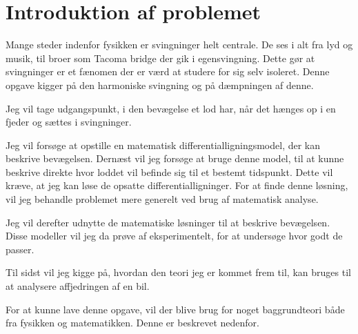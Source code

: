 \chapter{Introduktion af problemet}
Mange steder indenfor fysikken er svingninger helt centrale. 
De ses i alt fra lyd og musik, til broer som Tacoma bridge der gik i egensvingning. 
Dette gør at svingninger er et fænomen der er værd at studere for sig selv isoleret. 
Denne opgave kigger på den harmoniske svingning og på dæmpningen af denne.

Jeg vil tage udgangspunkt, i den bevægelse et lod har, når det hænges op i en fjeder og sættes i svingninger.

Jeg vil forsøge at opstille en matematisk differentialligningsmodel, der kan beskrive bevægelsen.
Dernæst vil jeg forsøge at bruge denne model, til at kunne beskrive direkte hvor loddet vil befinde sig til et bestemt tidspunkt. 
Dette vil kræve, at jeg kan løse de opsatte differentialligninger. 
For at finde denne løsning, vil jeg behandle problemet mere generelt ved brug af matematisk analyse. 

Jeg vil derefter udnytte de matematiske løsninger til at beskrive bevægelsen.
Disse modeller vil jeg da prøve af eksperimentelt, for at undersøge hvor godt de passer. 

Til sidst vil jeg kigge på, hvordan den teori jeg er kommet frem til, kan bruges til at analysere affjedringen af en bil. 
\vspace{1cm}

For at kunne lave denne opgave, vil der blive brug for noget baggrundteori både fra fysikken og matematikken. 
Denne er beskrevet nedenfor.


